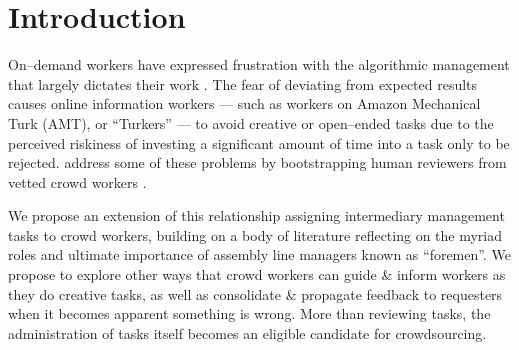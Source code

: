 \documentclass[main]{subfiles}
\begin{document}
\section{Introduction}\label{sec:introduction}



On--demand workers have expressed frustration with the algorithmic management that largely dictates their work
\cite{uberAlgorithm}. 
The fear of deviating from expected results causes online information workers 
--- such as workers on Amazon Mechanical Turk (AMT), or ``Turkers'' ---
to avoid creative or open--ended tasks due to the perceived riskiness of
investing a significant amount of time into a task only to be rejected.
\citeauthor{haas2015argonaut} address some of these problems by bootstrapping
human reviewers from vetted crowd workers
\cite{haas2015argonaut}.

We propose an extension of this relationship assigning intermediary management tasks to crowd workers,
building on a body of literature reflecting on the myriad roles and
ultimate importance of assembly line managers known as ``foremen''.
We propose to explore other ways that crowd workers can
guide \& inform workers as they do creative tasks,
as well as consolidate \& propagate feedback to requesters when it becomes apparent something is wrong.
More than reviewing tasks,
the administration of tasks itself becomes an eligible candidate for crowdsourcing.

\onlyinsubfile{
  \printbibliography
}
\end{document}
